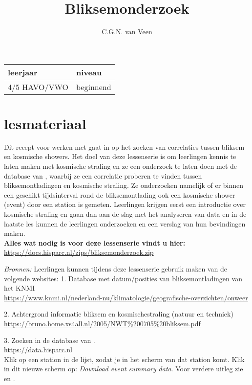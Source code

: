 
\usepackage{xfrac}
\usepackage{array}

\title{Bliksemonderzoek}
\author{C.G.N. van Veen}



\maketitle

\begin{tabular}{|>{\raggedright}p{3cm}|>{\raggedright}p{12cm}|}
\hline
leerjaar & niveau \tabularnewline
\hline
4/5 HAVO/VWO  & beginnend \tabularnewline
\hline
\end{tabular}

\section{lesmateriaal}

Dit recept voor werken met \hisparc gaat in op het zoeken van correlaties tussen
bliksem en kosmische showers. Het doel van deze lessenserie is om leerlingen
kennis te laten maken met kosmische straling en ze een onderzoek te laten doen
met de database van \hisparc, waarbij ze een correlatie proberen te vinden tussen
bliksemontladingen en kosmische straling. Ze onderzoeken namelijk of er binnen een geschikt
tijdsinterval rond de bliksemontlading ook een kosmische shower (event) door
een \hisparc station is gemeten.
Leerlingen krijgen eerst een introductie over kosmische straling en gaan
dan aan de slag met het analyseren van \hisparc data en in de laatste les kunnen
de leerlingen onderzoeken en een verslag van hun bevindingen maken.
\\

\textbf{Alles wat nodig is voor deze lessenserie vindt u hier:}\\
\url{https://docs.hisparc.nl/zips/bliksemonderzoek.zip}


\textit{Bronnen:} Leerlingen kunnen tijdens deze lessenserie gebruik maken van de
volgende websites:
1. Database met datum/posities van bliksemontladingen van het KNMI\\
\url{https://www.knmi.nl/nederland-nu/klimatologie/geografische-overzichten/onweer}

2. Achtergrond informatie bliksem en kosmischestraling (natuur en techniek)\\
\url{https://bruno.home.xs4all.nl/2005/NWT%200705%20bliksem.pdf}

3. Zoeken in de database van \hisparc.\\
\url{https://data.hisparc.nl}\\
Klik op een station in de lijst, zodat je in het scherm van dat station komt.
Klik in dit nieuwe scherm op: \textit{Download event summary data}.
Voor verdere uitleg zie  en .

